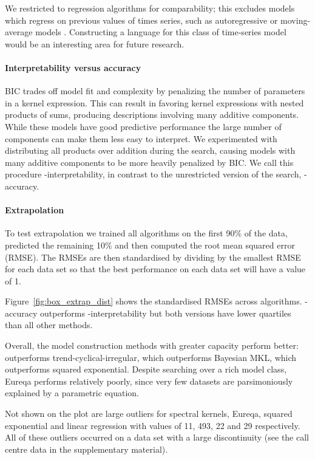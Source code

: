 We restricted to regression algorithms for comparability; this excludes models which regress on previous values of times series, such as autoregressive or moving-average models \citep[e.g.][]{Box1976-qk}.
Constructing a language for this class of time-series model would be an interesting area for future research.

\paragraph{Interpretability versus accuracy}

BIC trades off model fit and complexity by penalizing the number of parameters in a kernel expression.
This can result in \procedurename{} favoring kernel expressions with nested products of sums, producing descriptions involving many additive components.
While these models have good predictive performance the large number of components can make them less easy to interpret.
We experimented with distributing all products over addition during the search, causing models with many additive components to be more heavily penalized by BIC.
We call this procedure \procedurename{}-interpretability, in contrast to the unrestricted version of the search, \procedurename{}-accuracy.

\paragraph{Extrapolation}

To test extrapolation we trained all algorithms on the first 90\% of the data, predicted the remaining 10\% and then computed the root mean squared error (RMSE).
The RMSEs are then standardised by dividing by the smallest RMSE for each data set so that the best performance on each data set will have a value of 1.

Figure~\ref{fig:box_extrap_dist} shows the standardised RMSEs across algorithms.
\procedurename{}-accuracy outperforms \procedurename{}-interpretability but both versions have lower quartiles than all other methods.

Overall, the model construction methods with greater capacity perform better: \procedurename{} outperforms trend-cyclical-irregular, which outperforms Bayesian MKL, which outperforms squared exponential.
Despite searching over a rich model class, Eureqa performs relatively poorly, since very few datasets are parsimoniously explained by a parametric equation.

Not shown on the plot are large outliers for spectral kernels, Eureqa, squared exponential and linear regression with values of 11, 493, 22 and 29 respectively.
All of these outliers occurred on a data set with a large discontinuity (see the call centre data in the supplementary material).

